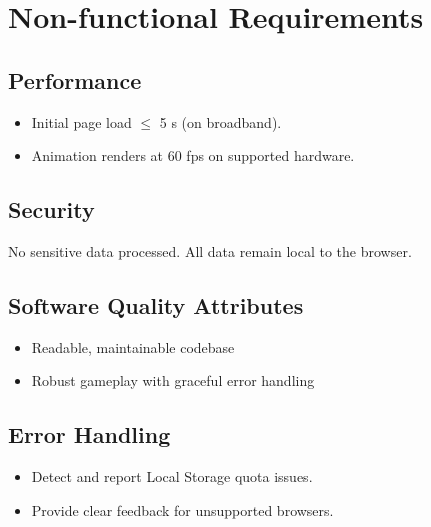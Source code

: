\documentclass[11pt]{scrreprt}
\begin{document}
\chapter{Non-functional Requirements}

\section{Performance}
\begin{itemize}
  \item Initial page load $\leq$ 5 s (on broadband).
  \item Animation renders at 60 fps on supported hardware.
\end{itemize}

\section{Security}
No sensitive data processed. All data remain local to the browser.

\section{Software Quality Attributes}
\begin{itemize}
  \item Readable, maintainable codebase
  \item Robust gameplay with graceful error handling
\end{itemize}

\section{Error Handling}
\begin{itemize}
  \item Detect and report Local Storage quota issues.
  \item Provide clear feedback for unsupported browsers.
\end{itemize}
\end{document}
